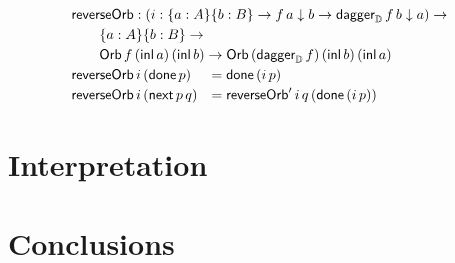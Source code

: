 \documentclass[runningheads,a4paper]{llncs}
\newcommand{\inl}{\mathsf{inl}}
\newcommand{\dn}{\downarrow}
\newcommand{\D}{\mathbb{D}}
\newcommand{\daggerD}{\mathsf{dagger}_\D}
\newcommand{\Orb}[3]{\mathsf{Orb}\,#1\,#2\,#3}
\newcommand{\done}{\mathsf{done}}
\renewcommand{\next}{\mathsf{next}}
\newcommand{\reverseOrbit}{\mathsf{reverseOrb}}
\begin{document}
\[
\def\arraystretch{1.2}
\begin{array}{ll}
\multicolumn{2}{l}{\reverseOrbit : (i : \{a : A\} \{b : B\} \to f \,a
  \dn b \to \daggerD\,f  \,b \dn a) \to} \\
\multicolumn{2}{l}{\qquad \{a : A\} \{b : B\} \to} \\
\multicolumn{2}{l}{\qquad \Orb f {(\inl\,a)}
  {(\inl\,b)} \to \Orb  {(\daggerD\,f)} {(\inl\,b)} {(\inl\,a)}}\\
\reverseOrbit \,i\, (\done \,p) &= \done \, (i \,p) \\
\reverseOrbit \,i\,(\next\,p\,q) &= \reverseOrbit' \,i\,q \,(\done \,(i\,p))
\end{array}
\]


\section{Interpretation}\label{sec:interpretation}

\section{Conclusions}


%
%
%
%
%
%


\end{document}
